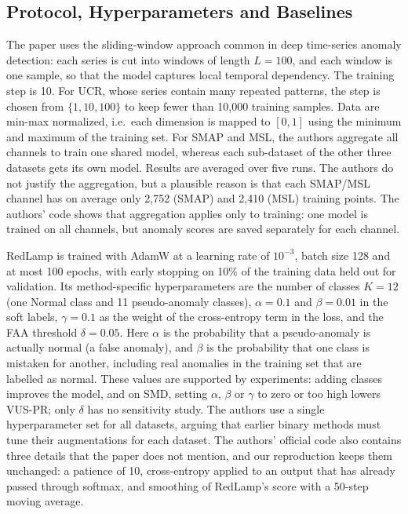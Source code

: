 \documentclass[sigconf,nonacm]{acmart}
\begin{document}
\subsection{Protocol, Hyperparameters and Baselines}
The paper uses the sliding-window approach common in deep time-series anomaly detection: each series is cut into windows of length $L = 100$, and each window is one sample, so that the model captures local temporal dependency. The training step is 10. For UCR, whose series contain many repeated patterns, the step is chosen from $\{1, 10, 100\}$ to keep fewer than 10,000 training samples. Data are min-max normalized, i.e.\ each dimension is mapped to $[0, 1]$ using the minimum and maximum of the training set. For SMAP and MSL, the authors aggregate all channels to train one shared model, whereas each sub-dataset of the other three datasets gets its own model. Results are averaged over five runs. The authors do not justify the aggregation, but a plausible reason is that each SMAP/MSL channel has on average only 2,752 (SMAP) and 2,410 (MSL) training points. The authors' code shows that aggregation applies only to training: one model is trained on all channels, but anomaly scores are saved separately for each channel.

RedLamp is trained with AdamW at a learning rate of $10^{-3}$, batch size 128 and at most 100 epochs, with early stopping on 10\% of the training data held out for validation. Its method-specific hyperparameters are the number of classes $K = 12$ (one Normal class and 11 pseudo-anomaly classes), $\alpha = 0.1$ and $\beta = 0.01$ in the soft labels, $\gamma = 0.1$ as the weight of the cross-entropy term in the loss, and the FAA threshold $\delta = 0.05$. Here $\alpha$ is the probability that a pseudo-anomaly is actually normal (a false anomaly), and $\beta$ is the probability that one class is mistaken for another, including real anomalies in the training set that are labelled as normal. These values are supported by experiments: adding classes improves the model, and on SMD, setting $\alpha$, $\beta$ or $\gamma$ to zero or too high lowers VUS-PR; only $\delta$ has no sensitivity study. The authors use a single hyperparameter set for all datasets, arguing that earlier binary methods must tune their augmentations for each dataset. The authors' official code also contains three details that the paper does not mention, and our reproduction keeps them unchanged: a patience of 10, cross-entropy applied to an output that has already passed through softmax, and smoothing of RedLamp's score with a 50-step moving average.
\end{document}

